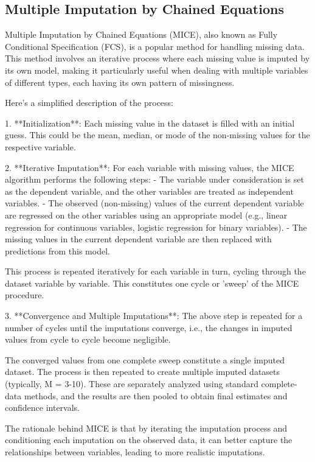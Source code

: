 \documentclass[a4paper,12pt,twoside,openright]{report}
\begin{document}
\subsection{Multiple Imputation by Chained Equations}

Multiple Imputation by Chained Equations (MICE), also known as Fully Conditional Specification (FCS), is a popular method for handling missing data. This method involves an iterative process where each missing value is imputed by its own model, making it particularly useful when dealing with multiple variables of different types, each having its own pattern of missingness.

Here's a simplified description of the process:

1. **Initialization**: Each missing value in the dataset is filled with an initial guess. This could be the mean, median, or mode of the non-missing values for the respective variable.

2. **Iterative Imputation**: For each variable with missing values, the MICE algorithm performs the following steps:
   - The variable under consideration is set as the dependent variable, and the other variables are treated as independent variables.
   - The observed (non-missing) values of the current dependent variable are regressed on the other variables using an appropriate model (e.g., linear regression for continuous variables, logistic regression for binary variables).
   - The missing values in the current dependent variable are then replaced with predictions from this model.
   
   This process is repeated iteratively for each variable in turn, cycling through the dataset variable by variable. This constitutes one cycle or 'sweep' of the MICE procedure.

3. **Convergence and Multiple Imputations**: The above step is repeated for a number of cycles until the imputations converge, i.e., the changes in imputed values from cycle to cycle become negligible. 

   The converged values from one complete sweep constitute a single imputed dataset. The process is then repeated to create multiple imputed datasets (typically, M = 3-10). These are separately analyzed using standard complete-data methods, and the results are then pooled to obtain final estimates and confidence intervals.

The rationale behind MICE is that by iterating the imputation process and conditioning each imputation on the observed data, it can better capture the relationships between variables, leading to more realistic imputations.
\end{document}
